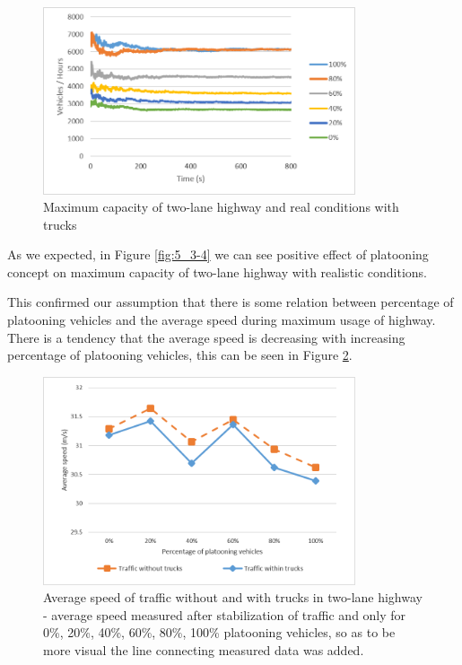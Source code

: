 \begin{figure}[ph]
\centering
\includegraphics[width=0.82\textwidth,height=0.82\textheight,keepaspectratio]{figures/Chapter_5/5_max_2lane_trucks.png}
\centering
\protect\caption[Maximum capacity of two-lane highway and real conditions with trucks]{\label{fig:5_3-2}Maximum capacity of two-lane highway and real conditions with trucks}
\end{figure}



As we expected, in Figure \ref{fig:5_3-4} we can see positive effect of platooning concept on maximum capacity of two-lane highway with realistic conditions. 

This confirmed our assumption that there is some relation between percentage of platooning vehicles and the average speed during maximum usage of highway. There is a tendency that the average speed is decreasing with increasing percentage of platooning vehicles, this can be seen in Figure \ref{fig:5_3-3}.

\begin{figure}[ph]
\centering
\includegraphics[width=0.82\textwidth,height=0.82\textheight,keepaspectratio]{figures/Chapter_5/5_E3_avgSpeed.png}
\centering
\protect\caption[Average speed of traffic without and with trucks in two-lane highway]{\label{fig:5_3-3}Average speed of traffic without and with trucks in two-lane highway  - average speed measured after stabilization of traffic and only for 0\%, 20\%, 40\%, 60\%, 80\%, 100\% platooning vehicles, so as to be more visual the line connecting measured data was added.}
\end{figure}

